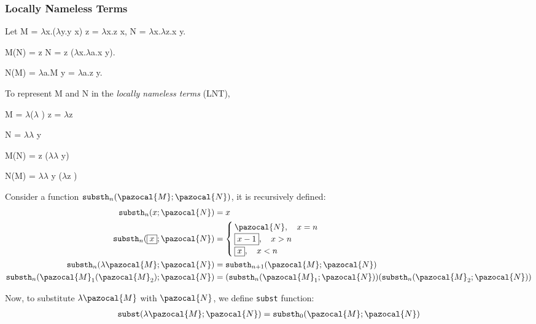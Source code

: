 \documentclass{article}
\theoremstyle{definition}
\newcommand{\lb}{$\lambda$}
\begin{document}
\subsubsection*{Locally Nameless Terms}

Let M = \lb x.(\lb y.y x) z = \lb x.z x, N = \lb x.\lb z.x y.

M(N) = z N = z (\lb x.\lb a.x y).

N(M) = \lb a.M y = \lb a.z y.

To represent M and N in the \emph{locally nameless terms} (LNT),
\begin{tcolorbox}
    M = \lb (\lb {} ) z = \lb z 

    N = \lb \lb {} y

    M(N) = z (\lb \lb {} y)

    N(M) = \lb \lb {} y (\lb z )
\end{tcolorbox}

Consider a function $\mathtt{substh}_n(\pazocal{M};\pazocal{N})$, it is recursively defined:
\begin{align*}
    \mathtt{substh}_n(x;\pazocal{N})                            & = x                                                                                            \\
    \mathtt{substh}_n(\fbox{$x$};\pazocal{N})                   & = \begin{cases}
                                                                        \pazocal{N},\quad x = n  \\
                                                                        \fbox{$x-1$},\quad x > n \\
                                                                        \fbox{$x$},\quad x < n
                                                                    \end{cases}                                                                     \\
    \mathtt{substh}_n(\lambda \pazocal{M};\pazocal{N})          & = \mathtt{substh}_{n+1}(\pazocal{M};\pazocal{N})                                               \\
    \mathtt{substh}_n(\pazocal{M}_1(\pazocal{M}_2);\pazocal{N}) & = (\mathtt{substh}_n(\pazocal{M}_1;\pazocal{N}))(\mathtt{substh}_n(\pazocal{M}_2;\pazocal{N}))
\end{align*}

Now, to substitute $\lambda \pazocal{M}$ with $\pazocal{N}$, we define \texttt{subst} function:
\begin{align*}
    \mathtt{subst}(\lambda\pazocal{M};\pazocal{N}) = \mathtt{substh}_0(\pazocal{M};\pazocal{N})
\end{align*}
\end{document}
